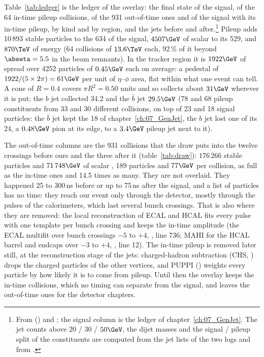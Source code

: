 Table~\ref{tab:ledger} is the ledger of the overlay: the final state of the signal, of the 64 in-time pileup
collisions, of the 931 out-of-time ones and of the signal with its in-time pileup, by kind and by region, and the
jets before and after.\footnote{From
 () and ;
the signal column is the ledger of chapter~\ref{ch:07_GenJet}. The jet counts above 20 / 30 / $50\GeV$, the
dijet masses and the signal / pileup split of the constituents are computed from the jet lists of the two
logs and from .} Pileup adds 10\,893 stable particles to the 634 of the
signal, $4507\GeV$ of scalar \pt{} to its 529, and $870\TeV$ of energy (64 collisions of $13.6\TeV$ each,
92\,\% of it beyond $\abseta=5.5$ in the beam remnants). In the tracker region it is $1922\GeV$ of \pt{}
spread over 4252 particles of $0.45\GeV$ each on average: a pedestal of $1922 / (5\times2\pi) = 61\GeV$ per
unit of $\eta$--$\phi$ area, flat within what one event can tell. A cone of $R=0.4$ covers $\pi R^2 = 0.50$
units and so collects about $31\GeV$ wherever it is put; the $b$ jet collected 34.2 and the $\bar b$ jet
$29.5\GeV$ (78 and 68 pileup constituents from 33 and 30 different collisions, on top of 23 and 18 signal
particles: the $\bar b$ jet kept the 18 of chapter~\ref{ch:07_GenJet}, the $b$ jet lost one of its 24, a
$0.48\GeV$ pion at its edge, to a $3.4\GeV$ pileup jet next to it).

The out-of-time columns are the 931 collisions that the draw puts into the twelve crossings before ours and the
three after it (table~\ref{tab:draw}): $176\,266$ stable particles and $71\,748\GeV$ of scalar \pt{}, 189
particles and $77\GeV$ per collision, as full as the in-time ones and 14.5 times as many. They are not overlaid.
They happened 25 to 300\,ns before or up to 75\,ns after the signal, and a list of particles has no time: they
reach our event only through the detector, mostly through the pulses of the calorimeters, which last several bunch
crossings. That is also where they are removed: the local reconstruction of ECAL and HCAL fits every pulse with one
template per bunch crossing and keeps the in-time amplitude (the ECAL multifit over bunch crossings $-5$ to $+4$,
, line 736; MAHI for the HCAL barrel and endcaps over $-3$ to $+4$,
, line 12). The in-time pileup is removed later still, at the reconstruction stage
of the jets: charged-hadron subtraction (CHS, ) drops the
charged particles of the other vertices, and PUPPI () weights
every particle by how likely it is to come from pileup. Until then the overlay keeps the in-time collisions, which
no timing can separate from the signal, and leaves the out-of-time ones for the detector chapters.

